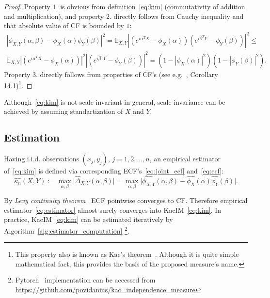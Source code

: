 \documentclass{article}
\begin{document}
\begin{proof}
	Property $\textit{1.}$ is obvious from definition~\eqref{eq:kim} (commutativity of addition and multiplication), and property $\textit{2.}$ directly follows from Cauchy inequality and that absolute value of CF is bounded by $1$:
	\begin{multline*}
	|\phi_{X,Y}(\alpha, \beta)  -\phi_{X}(\alpha) \phi_{Y}(\beta)|^{2} =
	\mathbb{E}_{X,Y} |( e^{i\alpha^{T}X} - \phi_{X}(\alpha) )(e^{i\beta^{T}Y}- \phi_{Y}(\beta) )|^{2} \leq \\
	\mathbb{E}_{X,Y} |( e^{i\alpha^{T}X} - \phi_{X}(\alpha) )|^{2} |(e^{i\beta^{T}Y}- \phi_{Y}(\beta) )|^{2}  = (1 - |\phi_{X}(\alpha)|^{2}) (1 - |\phi_{Y}(\beta)|^{2}).
	\end{multline*}
	Property $\textit{3.}$ directly follows from properties of CF's (see e.g.~\cite{Jacod}, Corollary 14.1)\footnote{This property also is known as Kac's theorem~\cite{KacTheorem}. Although it is quite simple mathematical fact, this provides the basis of the proposed measure's name.}.	
\end{proof}

Although~\eqref{eq:kim} is not scale invariant in general, scale invariance can be achieved by assuming standartization of $X$ and $Y$.


\subsection{Estimation}

Having i.i.d. observations $(x_{j}, y_{j})$, $j = 1,2,...,n$, an empirical estimator of~\eqref{eq:kim} is defined via corresponding ECF's~\eqref{eq:joint_ecf} and~\eqref{eq:ecf}:
\begin{equation}
\label{eq:estimator}
\widehat{\kappa_{n}}(X,Y) := \max_{\alpha, \beta} \vert \widehat{\Delta}_{X,Y}(\alpha, \beta) \vert =\max_{\alpha, \beta} \vert \widehat{\phi_{X,Y}}(\alpha,\beta)  - \widehat{\phi_{X}}(\alpha) \widehat{\phi_{Y}}(\beta) \vert.
\end{equation}

\noindent By \textit{Levy continuity theorem}~\cite{KacTheorem} ECF pointwise converges to CF. Therefore empirical estimator~\eqref{eq:estimator} almost surely converges into KacIM~\eqref{eq:kim}. In practice, KacIM~\eqref{eq:kim} can be estimated iteratively by Algorithm~\ref{alg:estimator_computation} \footnote{Pytorch~\cite{NEURIPS2019_9015} implementation can be accessed from \url{https://github.com/povidanius/kac_independence_measure}}. 
\end{document}

